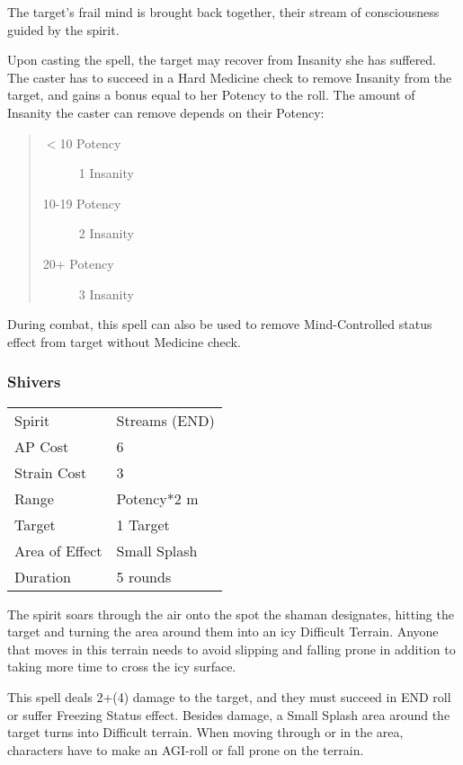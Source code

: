 \documentclass[11pt,a4paper,twocolumn]{book}
\begin{document}
\medskip

The target's frail mind is brought back together, their stream of consciousness guided by the spirit.

Upon casting the spell, the target may recover from Insanity she has suffered. The caster has to succeed in a Hard Medicine check to remove Insanity from the target, and gains a bonus equal to her Potency to the roll. The amount of Insanity the caster can remove depends on their Potency:

\begin{quote}
	\begin{description}
		\item[$<$10 Potency] 	1 Insanity
		\item[10-19 Potency] 	2 Insanity
		\item[20+ Potency] 	    3 Insanity	
	\end{description}	
\end{quote}

During combat, this spell can also be used to remove Mind-Controlled status effect from target without Medicine check.

\subsubsection*{Shivers}
{
	\begin{tabu} to 75mm{| X[l,4] | X[l,7] |}
		\hline
		Spirit 			& Streams (END) 		\\
		AP Cost	      	& 6 						\\
		Strain Cost     & 3 						\\
		Range     		& Potency*2	m				\\
		Target      	& 1 Target					\\
		Area of Effect  & Small Splash  	 				\\
		Duration     	& 5 rounds			\\ \hline
	\end{tabu}
	
}

The spirit soars through the air onto the spot the shaman designates, hitting the target and turning the area around them into an icy Difficult Terrain. Anyone that moves in this terrain needs to avoid slipping and falling prone in addition to taking more time to cross the icy surface.

This spell deals 2+(4) damage to the target, and they must succeed in END roll or suffer Freezing Status effect. Besides damage, a Small Splash area around the target turns into Difficult terrain. When moving through or in the area, characters have to make an AGI-roll or fall prone on the terrain.
\end{document}
